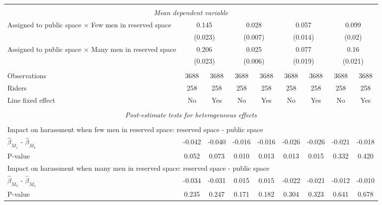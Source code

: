 \begin{tabular}{l*{8}{c}}
\\[-1.8ex] \hline \\[-1.8ex] \multicolumn{9}{c}{\textit{Mean dependent variable}} \\ Assigned to public space $\times$ Few men in reserved space& \multicolumn{2}{c}{0.145} & \multicolumn{2}{c}{0.028} & \multicolumn{2}{c}{0.057} & \multicolumn{2}{c}{0.099} \\  & \multicolumn{2}{c}{(0.023)} & \multicolumn{2}{c}{(0.007)} & \multicolumn{2}{c}{(0.014)} & \multicolumn{2}{c}{(0.02)} \\ Assigned to public space $\times$ Many men in reserved space & \multicolumn{2}{c}{0.206} & \multicolumn{2}{c}{0.025} & \multicolumn{2}{c}{0.077} & \multicolumn{2}{c}{0.16} \\  & \multicolumn{2}{c}{(0.023)} & \multicolumn{2}{c}{(0.006)} & \multicolumn{2}{c}{(0.019)} & \multicolumn{2}{c}{(0.021)} \\\\[-1ex] 
Observations        &        3688         &        3688         &        3688         &        3688         &        3688         &        3688         &        3688         &        3688         \\
Riders              &         258         &         258         &         258         &         258         &         258         &         258         &         258         &         258         \\
Line fixed effect   &          No         &         Yes         &          No         &         Yes         &          No         &         Yes         &          No         &         Yes         \\
\hline \\[-1ex]  \multicolumn{9}{c}{\textit{Post-estimate tests for heterogeneous effects}} \\\\[-1ex] \multicolumn{9}{l}{Impact on harassment when few men in reserved space: reserved space - public space} \\ \quad $\hat\beta_{M_1}$ - $\hat\beta_{M_2}$&      -0.042         &      -0.040         &      -0.016         &      -0.016         &      -0.026         &      -0.026         &      -0.021         &      -0.018         \\
\quad P-value       &       0.052         &       0.073         &       0.010         &       0.013         &       0.013         &       0.015         &       0.332         &       0.420         \\
\multicolumn{9}{l}{Impact on harassment when many men in reserved space: reserved space - public space} \\\quad $\hat\beta_{M_3}$ - $\hat\beta_{M_4}$&      -0.034         &      -0.031         &       0.015         &       0.015         &      -0.022         &      -0.021         &      -0.012         &      -0.010         \\
\quad P-value       &       0.235         &       0.247         &       0.171         &       0.182         &       0.304         &       0.323         &       0.641         &       0.678         \\
\hline\hline \end{tabular}
